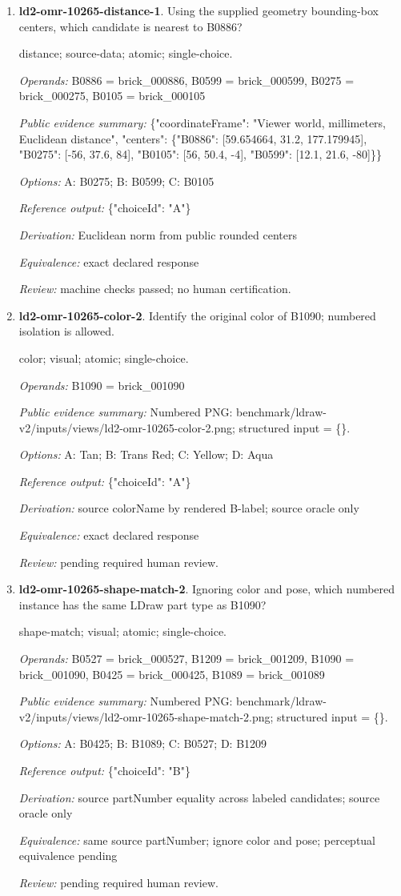 \begin{enumerate}
\item \textbf{ld2-omr-10265-distance-1}. Using the supplied geometry bounding-box centers, which candidate is nearest to B0886?
\par{\small distance; source-data; atomic; single-choice.\par\textit{Operands:} B0886 = brick\_000886, B0599 = brick\_000599, B0275 = brick\_000275, B0105 = brick\_000105\par\textit{Public evidence summary:} \{"coordinateFrame": "Viewer world, millimeters, Euclidean distance", "centers": \{"B0886": [59.654664, 31.2, 177.179945], "B0275": [-56, 37.6, 84], "B0105": [56, 50.4, -4], "B0599": [12.1, 21.6, -80]\}\}\par\textit{Options:} A: B0275; B: B0599; C: B0105\par\textit{Reference output:} \{"choiceId": "A"\}\par\textit{Derivation:} Euclidean norm from public rounded centers\par\textit{Equivalence:} exact declared response\par\textit{Review:} machine checks passed; no human certification.}
\item \textbf{ld2-omr-10265-color-2}. Identify the original color of B1090; numbered isolation is allowed.
\par{\small color; visual; atomic; single-choice.\par\textit{Operands:} B1090 = brick\_001090\par\textit{Public evidence summary:} Numbered PNG: benchmark/ldraw-v2/inputs/views/ld2-omr-10265-color-2.png; structured input = \{\}.\par\textit{Options:} A: Tan; B: Trans Red; C: Yellow; D: Aqua\par\textit{Reference output:} \{"choiceId": "A"\}\par\textit{Derivation:} source colorName by rendered B-label; source oracle only\par\textit{Equivalence:} exact declared response\par\textit{Review:} pending required human review.}
\item \textbf{ld2-omr-10265-shape-match-2}. Ignoring color and pose, which numbered instance has the same LDraw part type as B1090?
\par{\small shape-match; visual; atomic; single-choice.\par\textit{Operands:} B0527 = brick\_000527, B1209 = brick\_001209, B1090 = brick\_001090, B0425 = brick\_000425, B1089 = brick\_001089\par\textit{Public evidence summary:} Numbered PNG: benchmark/ldraw-v2/inputs/views/ld2-omr-10265-shape-match-2.png; structured input = \{\}.\par\textit{Options:} A: B0425; B: B1089; C: B0527; D: B1209\par\textit{Reference output:} \{"choiceId": "B"\}\par\textit{Derivation:} source partNumber equality across labeled candidates; source oracle only\par\textit{Equivalence:} same source partNumber; ignore color and pose; perceptual equivalence pending\par\textit{Review:} pending required human review.}

\end{enumerate}
